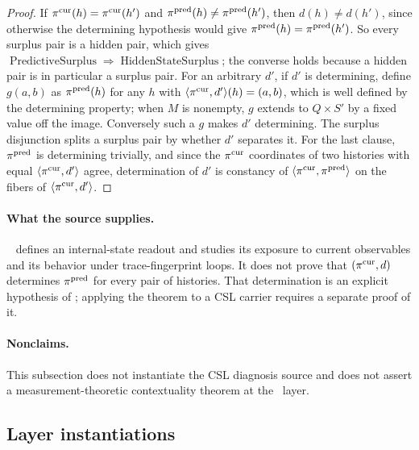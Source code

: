 \begin{proof}
If \(\pi^{\mathrm{cur}}(h)=\pi^{\mathrm{cur}}(h')\) and \(\pi^{\mathrm{pred}}(h)\ne\pi^{\mathrm{pred}}(h')\), then
\(d(h)\ne d(h')\), since otherwise the determining hypothesis would give
\(\pi^{\mathrm{pred}}(h)=\pi^{\mathrm{pred}}(h')\). So every surplus pair is a hidden pair, which gives
\(\operatorname{PredictiveSurplus}\Rightarrow\operatorname{HiddenStateSurplus}\);
the converse holds because a hidden pair is in particular a surplus pair.
For an arbitrary \(d'\), if \(d'\) is determining, define \(g(a,b)\) as
\(\pi^{\mathrm{pred}}(h)\) for any \(h\) with \(\langle\pi^{\mathrm{cur}},d'\rangle(h)=(a,b)\), which is
well defined by the determining property; when \(M\) is nonempty, \(g\) extends
to \(Q\times S'\) by a fixed value off the image. Conversely such a \(g\) makes
\(d'\) determining. The surplus disjunction splits a surplus pair by
whether \(d'\) separates it.
For the last clause, \(\pi^{\mathrm{pred}}\) is determining trivially, and since the \(\pi^{\mathrm{cur}}\) coordinates of two histories with equal \(\langle\pi^{\mathrm{cur}},d'\rangle\) agree, determination of \(d'\) is constancy of \(\langle\pi^{\mathrm{cur}},\pi^{\mathrm{pred}}\rangle\) on the fibers of \(\langle\pi^{\mathrm{cur}},d'\rangle\).
\end{proof}

\paragraph{What the source supplies.} \PaperCSL\ \citep{Tsiokos2026CSL} defines an internal-state readout and studies its exposure to current observables and its behavior under trace-fingerprint loops. It does not prove that \((\pi^{\mathrm{cur}},d)\) determines \(\pi^{\mathrm{pred}}\) for every pair of histories. That determination is an explicit hypothesis of ; applying the theorem to a CSL carrier requires a separate proof of it.


\paragraph{Nonclaims.} This subsection does not instantiate the CSL diagnosis source and does
not assert a measurement-theoretic contextuality theorem at the
\FIV\ layer.

\subsection*{Layer instantiations}\label{layer-inst:F13b}

